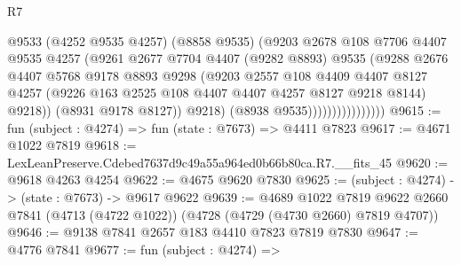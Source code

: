 \begin{lexlean}{R7}
\begin{coremodule}
                                @9533
                                  (@4252 @9535 @4257)
                                  (@8858 @9535)
                                  (@9203
                                    @2678
                                    @108
                                    @7706
                                    @4407
                                    @9535
                                    @4257
                                    (@9261
                                      @2677
                                      @7704
                                      @4407
                                      (@9282 @8893)
                                      @9535
                                      (@9288
                                        @2676
                                        @4407
                                        @5768
                                        @9178
                                        @8893
                                        @9298
                                        (@9203
                                          @2557
                                          @108
                                          @4409
                                          @4407
                                          @8127
                                          @4257
                                          (@9226
                                            @163
                                            @2525
                                            @108
                                            @4407
                                            @4407
                                            @4257
                                            @8127
                                            @9218
                                            @8144)
                                          @9218))
                                      (@8931 @9178 @8127))
                                    @9218)
                                  (@8938 @9535))))))))))))))))
@9615 := fun (subject : @4274) => fun (state : @7673) => @4411 @7823
@9617 := @4671 @1022 @7819
@9618 := LexLeanPreserve.Cdebed7637d9c49a55a964ed0b66b80ca.R7.__fits_45
@9620 := @9618 @4263 @4254
@9622 := @4675 @9620 @7830
@9625 := (subject : @4274) -> (state : @7673) -> @9617 @9622
@9639 := @4689
    @1022
    @7819
    @9622
    @2660
    @7841
    (@4713 (@4722 @1022))
    (@4728 (@4729 (@4730 @2660) @7819 @4707))
@9646 := @9138 @7841 @2657 @183 @4410 @7823 @7819 @7830
@9647 := @4776 @7841
@9677 := fun (subject : @4274) =>

\end{coremodule}
\end{lexlean}
